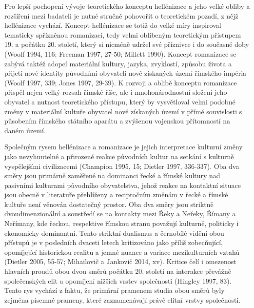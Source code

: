 Pro lepší pochopení vývoje teoretického konceptu hellénizace a jeho velké obliby a rozšíření mezi badateli je nutné stručně pohovořit o teoretickém pozadí, z nějž hellénizace vychází. Koncept hellénizace se totiž do velké míry inspiroval tematicky spřízněnou romanizací, tedy velmi oblíbeným teoretickým přístupem 19. a počátku 20. století, který si nicméně udržel své příznivce i do současné doby (Woolf 1994, 116; Freeman 1997, 27-50; Millett 1990). Koncept romanizace se zabývá taktéž adopcí materiální kultury, jazyka, zvyklostí, způsobu života a přijetí nové identity původními obyvateli nově získaných území římského impéria (Woolf 1997, 339; Jones 1997, 29-39). K rozvoji a oblibě konceptu romanizace přispěl nejen velký rozsah římské říše, ale i mnohonárodnostní složení jeho obyvatel a nutnost teoretického přístupu, který by vysvětloval velmi podobné změny v materiální kultuře obyvatel nově získaných území v přímé souvislosti s působením římského státního aparátu a zvýšenou vojenskou přítomností na daném území.

Společným rysem hellénizace a romanizace je jejich interpretace kulturní změny jako nevyhnutelné a přirozené reakce původních kultur na setkání s kulturně vyspělejšími civilizacemi (Champion 1995, 15; Dietler 1997, 336-337). Oba dva směry jsou primárně zaměřené na dominanci řecké a římské kultury nad pasivními kulturami původního obyvatelstva, jehož reakce na kontaktní situace jsou obecně v literatuře přehlíženy a recipročním změnám v řecké a římské kultuře není věnován dostatečný prostor. Oba dva směry jsou striktně dvoudimenzionální a soustředí se na kontakty mezi Řeky a Neřeky, Římany a Neřímany, kde řeckou, respektive římskou stranu považují kulturně, politicky i ekonomicky dominantní. Tento striktní dualismus a černobílé vidění obou přístupů je v posledních dvaceti letech kritizováno jako příliš zobecňující, opomíjející historickou realitu a jemné nuance a variace mezikulturních vztahů (Dietler 2005, 55-57; Mihailovič a Jankovič 2014, xv). Kritice čelí i omezenost hlavních proudů obou dvou směrů počátku 20. století na interakce převážně společenských elit a opomíjení nižších vrstev společnosti (Hingley 1997, 83). Tento rys vychází z faktu, že primární pramenem studia obou směrů byly zejména písemné prameny, které zaznamenávají právě elitní vrstvy společnosti.


